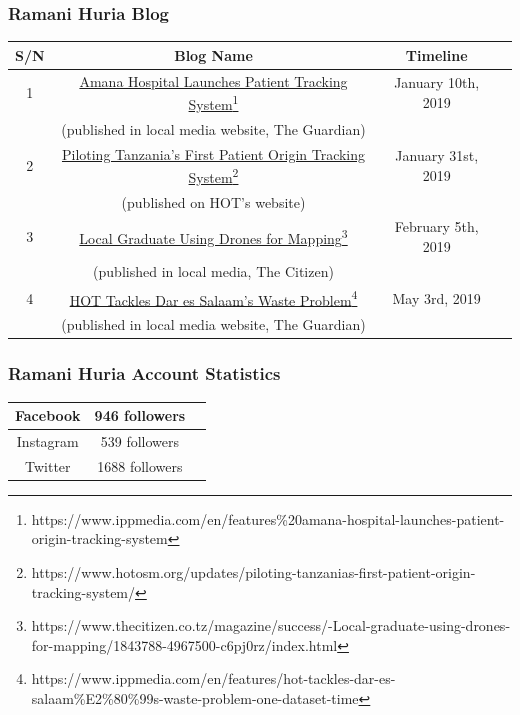 \documentclass[a4paper,12pt,twoside]{article}
\begin{document}
\subsubsection{Ramani Huria Blog}
\begin{tabular}{|c|c|c|c|}
\hline
\bfseries S/N & \bfseries Blog Name & \bfseries Timeline\\
\hline
1 & \href{https://www.ippmedia.com/en/features\%20amana-hospital-launches-patient-origin-tracking-system}{Amana Hospital Launches Patient Tracking System\footnote{\url{https://www.ippmedia.com/en/features\%20amana-hospital-launches-patient-origin-tracking-system}}}  & January 10th, 2019\\
{} & (published in local media website, The Guardian) & {}\\
\hline
2 & \href{https://www.hotosm.org/updates/piloting-tanzanias-first-patient-origin-tracking-system/}{Piloting Tanzania’s First Patient Origin Tracking System\footnote{\url{https://www.hotosm.org/updates/piloting-tanzanias-first-patient-origin-tracking-system/}}} & January 31st, 2019\\
{} & (published on HOT’s website) & {}\\
\hline
3 & \href{https://www.thecitizen.co.tz/magazine/success/-Local-graduate-using-drones-for-mapping/1843788-4967500-c6pj0rz/index.html}{Local Graduate Using Drones for Mapping\footnote{\url{https://www.thecitizen.co.tz/magazine/success/-Local-graduate-using-drones-for-mapping/1843788-4967500-c6pj0rz/index.html}}} & February 5th, 2019\\
{} & (published in local media, The Citizen) & {}\\
\hline
4 & \href{https://www.ippmedia.com/en/features/hot-tackles-dar-es-salaam\%E2\%80\%99s-waste-problem-one-dataset-time}{HOT Tackles Dar es Salaam’s Waste Problem\footnote{\url{https://www.ippmedia.com/en/features/hot-tackles-dar-es-salaam\%E2\%80\%99s-waste-problem-one-dataset-time}}} & May 3rd, 2019\\
{} & (published in local media website, The Guardian) & {}\\
\hline
\end{tabular}

\subsubsection{Ramani Huria Account Statistics}
\begin{center}

\begin{tabular}{|c|c|c|}
\hline
Facebook & 946 followers\\
\hline
Instagram & 539 followers\\
\hline
Twitter & 1688 followers\\
\hline
\end{tabular}
\end{center}
\end{document}
